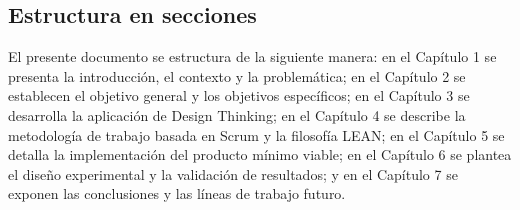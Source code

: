 \subsection{Estructura en secciones}\label{estructura-en-secciones}

El presente documento se estructura de la siguiente manera: en el Capítulo 1 se presenta la introducción, el contexto y la problemática; en el Capítulo 2 se establecen el objetivo general y los objetivos específicos; en el Capítulo 3 se desarrolla la aplicación de Design Thinking; en el Capítulo 4 se describe la metodología de trabajo basada en Scrum y la filosofía LEAN; en el Capítulo 5 se detalla la implementación del producto mínimo viable; en el Capítulo 6 se plantea el diseño experimental y la validación de resultados; y en el Capítulo 7 se exponen las conclusiones y las líneas de trabajo futuro.
